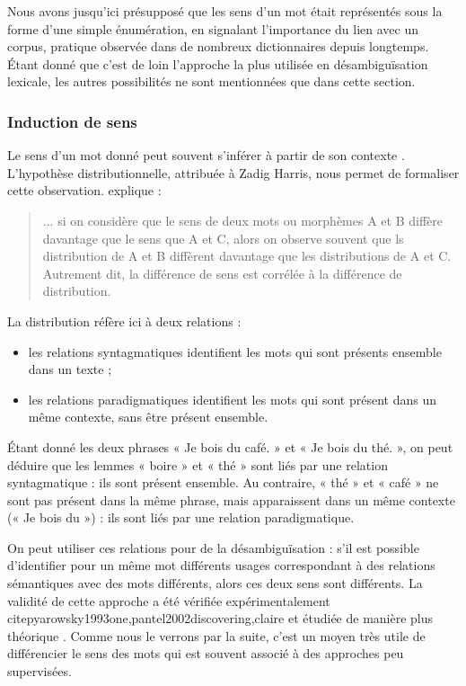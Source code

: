 Nous avons jusqu'ici présupposé que les sens d'un mot était représentés sous la
forme d'une simple énumération, en signalant l'importance du lien avec un
corpus, pratique observée dans de nombreux dictionnaires depuis longtemps.
Étant donné que c'est de loin l'approche la plus utilisée en désambiguïsation
lexicale, les autres possibilités ne sont mentionnées que dans cette section.

\subsubsection{Induction de sens}
\label{distrib}

Le sens d'un mot donné peut souvent s'inférer à partir de son contexte
\citep{pantel2002discovering}. L'hypothèse distributionnelle, attribuée à Zadig
Harris, nous permet de formaliser cette observation.
\cite[p.~786]{harris1954distributional} explique :

\begin{quote} ... si on considère que le sens de deux mots ou morphèmes A et B
    diffère davantage que le sens que A et C, alors on observe souvent que ls
    distribution de A et B diffèrent davantage que les distributions de A et C.
    Autrement dit, la différence de sens est corrélée à la différence de
    distribution.  \end{quote}

La distribution réfère ici à deux relations \citep{sahlgren2008distributional}
:

\begin{itemize}

    \item les relations syntagmatiques identifient les mots qui sont présents
        ensemble dans un texte ;

    \item les relations paradigmatiques identifient les mots qui sont présent
        dans un même contexte, sans être présent ensemble.

\end{itemize}

Étant donné les deux phrases « Je bois du café. » et « Je bois du thé. », on
peut déduire que les lemmes « boire » et « thé » sont liés par une relation
syntagmatique : ils sont présent ensemble. Au contraire, « thé » et « café » ne
sont pas présent dans la même phrase, mais apparaissent dans un même contexte
(« Je bois du ») : ils sont liés par une relation paradigmatique.

On peut utiliser ces relations pour de la désambiguïsation : s'il est possible
d'identifier pour un même mot différents usages correspondant à des relations
sémantiques avec des mots différents, alors ces deux sens sont différents. La
validité de cette approche a été vérifiée expérimentalement
citep{yarowsky1993one,pantel2002discovering,claire} et étudiée de manière plus
théorique \citep{sahlgren2006word,sahlgren2008distributional}. Comme nous le
verrons par la suite, c'est un moyen très utile de différencier le sens des
mots qui est souvent associé à des approches peu supervisées.

